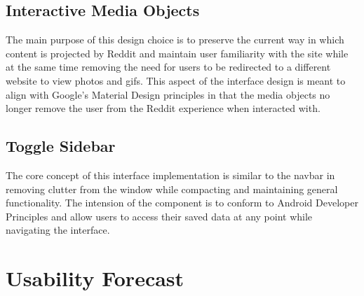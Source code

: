 \documentclass{article}
\begin{document}
\subsection{Interactive Media Objects} The main purpose of this design choice is to preserve the current way in which content is projected by Reddit and maintain user familiarity with the site while at the same time removing the need for users to be redirected to a different website to view photos and gifs. This aspect of the interface design is meant to align with Google's Material Design principles in that the media objects no longer remove the user from the Reddit experience when interacted with.

\subsection{Toggle Sidebar} The core concept of this interface implementation is similar to the navbar in removing clutter from the window while compacting and maintaining general functionality. The intension of the component is to conform to Android Developer Principles and allow users to access their saved data at any point while navigating the interface.

\section{Usability Forecast}
\end{document}
